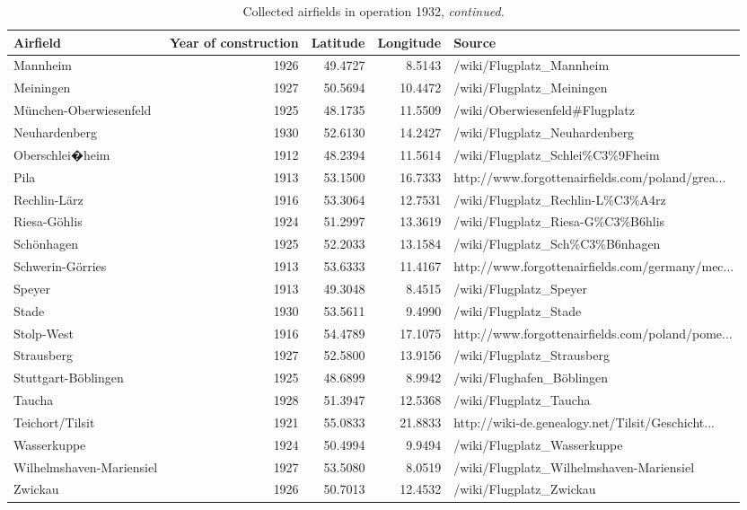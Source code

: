 \begin{table}[h!] 
 \centering 
 \caption{Collected airfields in operation 1932, \textit{continued.}}  
 {\scriptsize 
 \begin{tabular}{p{2.8cm}rrrp{6cm}} 
 \toprule 
 Airfield & Year of construction & Latitude & Longitude & Source  \\ 
 \midrule 
 \midrule
Mannheim & 1926 & 49.4727 & 8.5143 & /wiki/Flugplatz\_Mannheim \\ 
  Meiningen & 1927 & 50.5694 & 10.4472 & /wiki/Flugplatz\_Meiningen \\ 
  M\"unchen-Oberwiesenfeld & 1925 & 48.1735 & 11.5509 & /wiki/Oberwiesenfeld\#Flugplatz \\ 
  Neuhardenberg & 1930 & 52.6130 & 14.2427 & /wiki/Flugplatz\_Neuhardenberg \\ 
  Oberschlei�heim & 1912 & 48.2394 & 11.5614 & /wiki/Flugplatz\_Schlei\%C3\%9Fheim \\ 
  Pila & 1913 & 53.1500 & 16.7333 & http://www.forgottenairfields.com/poland/grea... \\ 
  Rechlin-L\"arz & 1916 & 53.3064 & 12.7531 & /wiki/Flugplatz\_Rechlin-L\%C3\%A4rz \\ 
  Riesa-G\"ohlis & 1924 & 51.2997 & 13.3619 & /wiki/Flugplatz\_Riesa-G\%C3\%B6hlis \\ 
  Sch\"onhagen & 1925 & 52.2033 & 13.1584 & /wiki/Flugplatz\_Sch\%C3\%B6nhagen \\ 
  Schwerin-G\"orries & 1913 & 53.6333 & 11.4167 & http://www.forgottenairfields.com/germany/mec... \\ 
   \midrule
Speyer & 1913 & 49.3048 & 8.4515 & /wiki/Flugplatz\_Speyer \\ 
  Stade & 1930 & 53.5611 & 9.4990 & /wiki/Flugplatz\_Stade \\ 
  Stolp-West & 1916 & 54.4789 & 17.1075 & http://www.forgottenairfields.com/poland/pome... \\ 
  Strausberg & 1927 & 52.5800 & 13.9156 & /wiki/Flugplatz\_Strausberg \\ 
  Stuttgart-B\"oblingen & 1925 & 48.6899 & 8.9942 & /wiki/Flughafen\_B\"oblingen \\ 
  Taucha & 1928 & 51.3947 & 12.5368 & /wiki/Flugplatz\_Taucha \\ 
  Teichort/Tilsit & 1921 & 55.0833 & 21.8833 & http://wiki-de.genealogy.net/Tilsit/Geschicht... \\ 
  Wasserkuppe & 1924 & 50.4994 & 9.9494 & /wiki/Flugplatz\_Wasserkuppe \\ 
  Wilhelmshaven-Mariensiel & 1927 & 53.5080 & 8.0519 & /wiki/Flugplatz\_Wilhelmshaven-Mariensiel \\ 
  Zwickau & 1926 & 50.7013 & 12.4532 & /wiki/Flugplatz\_Zwickau \\ 
   \midrule
 \bottomrule
\end{tabular}
}
\end{table}
